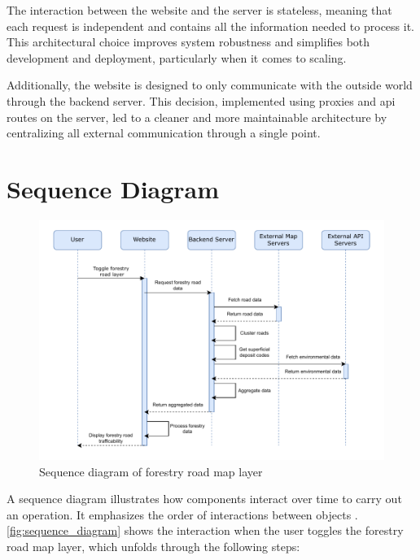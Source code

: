 The interaction between the website and the server is stateless, meaning that each request is independent and contains all the information needed to process it. This architectural choice improves system robustness and simplifies both development and deployment, particularly when it comes to scaling.

Additionally, the website is designed to only communicate with the outside world through the backend server. This decision, implemented using proxies and \acrshort{api} routes on the server, led to a cleaner and more maintainable architecture by centralizing all external communication through a single point.

\section{Sequence Diagram}

\begin{figure}[h]
    \centering
    \includegraphics[width=1\linewidth]{figures/sequence_diagram.pdf}
    \caption{Sequence diagram of forestry road map layer}
    \label{fig:sequence_diagram}
\end{figure}

A sequence diagram illustrates how components interact over time to carry out an operation. It emphasizes the order of interactions between objects \cite{sequencediagram}. \autoref{fig:sequence_diagram} shows the interaction when the user toggles the forestry road map layer, which unfolds through the following steps:

